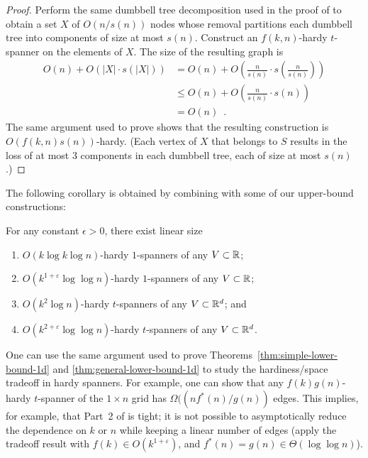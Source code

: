 \documentclass{patmorin}
\newcommand{\eps}{\varepsilon}
\begin{document}
\begin{proof}
  Perform the same dumbbell tree decomposition used in the proof of
   to obtain a set $X$ of $O(n/s(n))$ nodes whose removal
  partitions each dumbbell tree into components of size at most $s(n)$.
  Construct an $f(k,n)$-hardy $t$-spanner on the elements of $X$.
  The size of the resulting graph is 
  \begin{align*}
    O(n) + O(|X|\cdot s(|X|)) 
       & = O(n) + O\left(\frac{n}{s(n)}\cdot s\left(\frac{n}{s(n)}\right)\right) \\
       & \le O(n) + O\left(\frac{n}{s(n)}\cdot s(n)\right) \\
       & = O(n) \enspace . 
  \end{align*}
  The same argument used to prove  shows that the resulting
  construction is $O(f(k,n)s(n))$-hardy.  (Each vertex of $X$ that
  belongs to $S$ results in the loss of at most 3 components in each
  dumbbell tree, each of size at most $s(n)$.)
\end{proof}

The following corollary is obtained by combining 
with some of our upper-bound constructions:
\begin{cor}
  For any constant $\epsilon >0$, there exist linear size
  \begin{enumerate}
    \item $O(k\log k\log n)$-hardy $1$-spanners of any
      $V\subset \mathbb{R}$;
    \item $O(k^{1+\eps}\log\log n)$-hardy $1$-spanners of any
      $V\subset \mathbb{R}$;
    \item $O(k^2\log n)$-hardy $t$-spanners of any
      $V\subset \mathbb{R}^d$; and
    \item $O(k^{2+\eps}\log\log n)$-hardy $t$-spanners of any
      $V\subset \mathbb{R}^d$.
  \end{enumerate}
\end{cor}


\begin{rem}
One can use the same argument used to prove
Theorems~\ref{thm:simple-lower-bound-1d} and
\ref{thm:general-lower-bound-1d} to study the hardiness/space tradeoff
in hardy spanners.  For example, one can show that any $f(k)g(n)$-hardy
$t$-spanner of the $1\times n$ grid has $\Omega((nf^*(n)/g(n))$ edges.
This implies, for example, that Part~2 of  is tight;
it is not possible to asymptotically reduce the dependence on $k$ or $n$
while keeping a linear number of edges (apply the tradeoff result with
$f(k)\in O(k^{1+\eps})$, and $f^*(n)=g(n)\in \Theta(\log\log n)$).
\end{rem}
\end{document}
